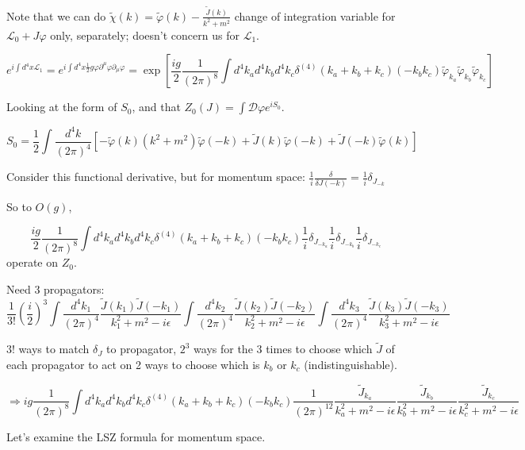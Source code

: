 \documentclass[twoside]{amsart}
\begin{document}
Note that we can do $\widetilde{\chi}(k) = \widetilde{\varphi}(k) - \frac{ \widetilde{J}(k)}{k^2 + m^2}$ change of integration variable for $\mathcal{L}_0 + J \varphi$ only, separately; doesn't concern us for $\mathcal{L}_1$.  

\[
e^{ i \int d^4x \mathcal{L}_1} = e^{ i \int d^4x \frac{1}{2} g \varphi \partial^{\mu} \varphi \partial_{\mu} \varphi} = \exp{ \left[ \frac{ig}{2} \frac{1}{(2\pi)^ 8 } \int d^4k_a d^4k_b d^4k_c \delta^{(4)}(k_a + k_b +k_c)(-k_b k_c) \widetilde{\varphi}_{k_a} \widetilde{\varphi}_{k_b} \widetilde{\varphi}_{k_c} \right] }
\]

Looking at the form of $S_0$, and that $Z_0(J) = \int \mathcal{D} \varphi e^{iS_0}$.  

\[
S_0 = \frac{1}{2} \int \frac{d^4k}{(2\pi)^4} \left[ - \widetilde{\varphi}(k) ( k^2 + m^2) \widetilde{\varphi}(-k) + \widetilde{J}(k) \widetilde{\varphi}(-k) + \widetilde{J}(-k) \widetilde{\varphi}(k) \right]
\]

Consider this functional derivative, but for momentum space: $\frac{1}{i} \frac{ \delta}{ \delta J(-k) } = \frac{1}{i} \delta_{J_{-k} }$

So to $O(g)$, 

\[
\frac{ig}{2} \frac{1}{(2\pi)^8} \int d^4k_a d^4k_b d^4k_c \delta^{(4)}(k_a + k_b + k_c) (-k_b k_c) \frac{1}{i} \delta_{J_{-k_a}} \frac{1}{i} \delta_{J_{-k_b} } \frac{1}{i} \delta_{J_{-k_c}}
\]
operate on $Z_0$.  

Need 3 propagators:
\[
\frac{1}{3!} \left( \frac{i}{2} \right)^3 \int \frac{d^4k_1}{ (2\pi)^4} \frac{ \widetilde{J}(k_1) \widetilde{J}(-k_1) }{ k_1^2 + m^2 - i \epsilon } \int \frac{d^4k_2}{ (2\pi)^4} \frac{ \widetilde{J}(k_2) \widetilde{J}(-k_2) }{ k_2^2 + m^2 - i \epsilon } \int \frac{d^4k_3}{ (2\pi)^4} \frac{ \widetilde{J}(k_3) \widetilde{J}(-k_3) }{ k_3^2 + m^2 - i \epsilon } 
\]

$3!$ ways to match $\delta_J$ to propagator, $2^3$ ways for the 3 times to choose which $\widetilde{J}$ of each propagator to act on 2 ways to choose which is $k_b$ or $k_c$ (indistinguishable).  

\[
\Longrightarrow ig \frac{1}{(2\pi)^8} \int d^4k_a d^4k_b d^4k_c \delta^{(4)}(k_a + k_b + k_c) (-k_b k_c) \frac{1}{(2\pi)^{12}} \frac{ \widetilde{J}_{k_a} }{ k_a^2 + m^2 - i \epsilon} \frac{ \widetilde{J}_{k_b} }{ k_b^2 + m^2 - i \epsilon} \frac{ \widetilde{J}_{k_c} }{ k_c^2 + m^2 - i \epsilon}
\]

\hrulefill 

Let's examine the LSZ formula for momentum space.  
\end{document}
